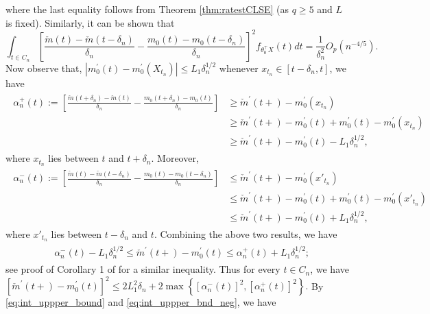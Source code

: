 where the last equality follows from Theorem \ref{thm:ratestCLSE} (as $q\ge5$ and $L$ is fixed).
Similarly, it can be shown that
\begin{equation}\label{eq:int_uppper_bnd_neg}
\int_{t\in C_n} \left[ \frac{\check{m}(t)- \check{m}(t-\delta_n)}{ \delta_n}- \frac{m_0(t)- m_0(t-\delta_n)}{ \delta_n}\right]^2 f_{\theta_0^\top X}(t) dt
= \frac{1}{\delta_n^2} O_p(n^{-4/5}).
\end{equation}
Now observe that, $|m_0^{\prime} (t)- m_0^{\prime} (X_{t_n})|\le L_1 \delta_n^{1/2}$ whenever $x_{t_n} \in [t-\delta_n, t]$, we have
\begin{align}\label{eq:integrnd_bd_pos}
\begin{split}
\alpha_n^+(t):=\left[ \frac{\check{m}(t+\delta_n)- \check{m}(t)}{ \delta_n}- \frac{m_0(t+\delta_n)- m_0(t)}{ \delta_n}\right] &\ge \check{m}^\prime(t+) - m_0^\prime(x_{t_n})\\
 &\ge \check{m}^\prime(t+) - m_0^\prime(t)+  m_0^\prime(t) -m_0^\prime(x_{t_n})\\
 &\ge  \check{m}^\prime(t+) - m_0^\prime(t) -L_1 \delta_n^{1/2},
\end{split}
\end{align}
where $x_{t_n}$ lies between $t$ and $t+\delta_n$. Moreover,
\begin{align}\label{eq:integrnd_bd_neg}
\begin{split}
\alpha_n^-(t):=\left[ \frac{\check{m}(t)- \check{m}(t-\delta_n)}{ \delta_n}- \frac{m_0(t)- m_0(t-\delta_n)}{ \delta_n}\right] &\le \check{m}^\prime(t+) - m_0^\prime(x'_{t_n})\\
 &\le \check{m}^\prime(t+) - m_0^\prime(t)+  m_0^\prime(t) -m_0^\prime(x'_{t_n})\\
 &\le  \check{m}^\prime(t+) - m_0^\prime(t) +L_1 \delta_n^{1/2},
\end{split}
\end{align}
where $x'_{t_n}$ lies between $t-\delta_n$ and $t$. Combining the above two results, we have
\begin{align}\label{eq:bnd_both_side}
\begin{split}
 &\alpha_n^-(t)-L_1 \delta_n^{1/2}  \le \check{m}^\prime(t+) - m_0^\prime(t)  \le\alpha_n^+(t) + L_1 \delta_n^{1/2};
\end{split}
\end{align}
see proof of Corollary 1 of \cite{DumbgenEtAL04} for a similar inequality. Thus for every $t \in C_n$, we have   $[\check{m}^\prime(t+) - m_0^\prime(t) ]^2 \le 2 L_1^2 \delta_n  +  2\max\left\{ [\alpha_n^-(t)]^2 ,   [\alpha_n^+(t)]^2 \right\}.$ By \eqref{eq:int_uppper_bound} and \eqref{eq:int_uppper_bnd_neg}, we have
